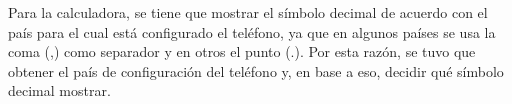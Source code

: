 \begin{itemize}
Para la calculadora, se tiene que mostrar el símbolo decimal de acuerdo con el país para el cual está configurado el teléfono, ya que en algunos países se usa la coma (,) como separador y en otros el punto (.). Por esta razón, se tuvo que obtener el país de configuración del teléfono y, en base a eso, decidir qué símbolo decimal mostrar.

\end{itemize}
%
%
%
%
%
%
